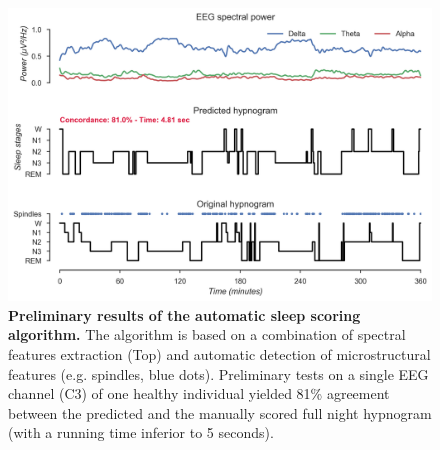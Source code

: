 \begin{figure}[htb]
	\includegraphics[width=\textwidth]{Fig/Discussion/autoscore.png}
	\caption[Preliminary results of the automatic sleep scoring algorithm]{\textbf{Preliminary results of the automatic sleep scoring algorithm.} The algorithm is based on a combination of spectral features extraction (Top) and automatic detection of microstructural features (e.g. spindles, blue dots). Preliminary tests on a single EEG channel (C3) of one healthy individual yielded 81\% agreement between the predicted and the manually scored full night hypnogram (with a running time inferior to 5 seconds).}
	\label{fig:disc:methods:future:autoscore}
\end{figure}


